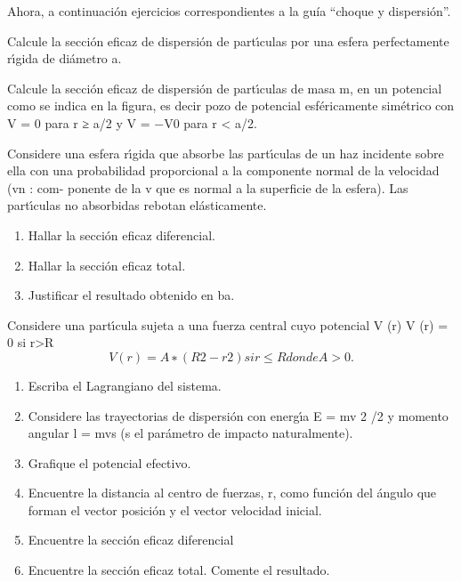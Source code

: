 \documentclass[10pt,oneside]{CBFT_book}
\begin{document}
Ahora, a continuación ejercicios correspondientes a la guía ``choque y dispersión''.

\begin{ejercicios}

\label{ej1}
\item{ \bf }
Calcule la sección eficaz de dispersión de partı́culas por una esfera perfectamente rı́gida
de diámetro a.

\label{ej2}
\item{ \bf }
Calcule la sección eficaz de dispersión de partı́culas de masa m, en un potencial como
se indica en la figura, es decir pozo de potencial esféricamente simétrico con V = 0
para r ≥ a/2 y V = −V0 para r < a/2.

\label{ej3}
\item{ \bf }
Considere una esfera rı́gida que absorbe las partı́culas de un haz incidente sobre ella
con una probabilidad proporcional a la componente normal de la velocidad (vn : com-
ponente de la v que es normal a la superficie de la esfera). Las partı́culas no absorbidas
rebotan elásticamente.
\begin{enumerate}[label=(\alph*)]
\item Hallar la sección eficaz diferencial.
\item Hallar la sección eficaz total.
\item Justificar el resultado obtenido en ba.
\end{enumerate}

\label{ej4}
\item{ \bf }
Considere una partı́cula sujeta a una fuerza central cuyo potencial V (r) V (r) = 0 si r>R
\[
V (r) = A ∗ (R2 − r2 ) si r ≤ R donde A > 0.
\]
\begin{enumerate}[label=(\alph*)]
\item Escriba el Lagrangiano del sistema.
\item Considere las trayectorias de dispersión con energı́a E = mv 2 /2 y momento
angular l = mvs (s el parámetro de impacto naturalmente).
\item Grafique el potencial efectivo.
\item Encuentre la distancia al centro de fuerzas, r, como función del ángulo que forman
el vector posición y el vector velocidad inicial.
\item Encuentre la sección eficaz diferencial
\item Encuentre la sección eficaz total. Comente el resultado.
\end{enumerate}


\end{ejercicios}
\end{document}
